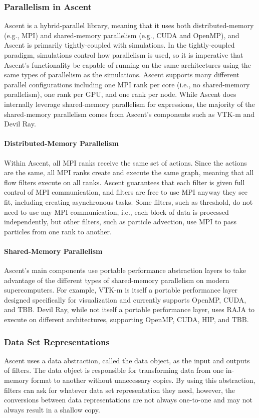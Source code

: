 \subsubsection{Parallelism in Ascent}
Ascent is a hybrid-parallel library, meaning that it uses both
distributed-memory (e.g., MPI) and shared-memory parallelism
(e.g., CUDA and OpenMP), and Ascent is primarily
tightly-coupled with simulations.
%
In the tightly-coupled paradigm, simulations control how parallelism is used, so
it is imperative that Ascent's functionality be capable of running
on the same architectures using the same types of parallelism as the
simulations.
%
Ascent supports many different parallel configurations including
one MPI rank per core (i.e., no shared-memory parallelism), one rank
per GPU, and one rank per node.
%
While Ascent does internally leverage shared-memory parallelism
for expressions, the majority of the shared-memory parallelism comes
from Ascent's components such as VTK-m and Devil Ray.

\paragraph{Distributed-Memory Parallelism}
Within Ascent, all MPI ranks receive the same set of actions.
%
Since the actions are the same, all MPI ranks create and execute the same graph,
meaning that all flow filters execute on all ranks.
%
Ascent guarantees that each filter is given full control of MPI communication,
and filters are free to use MPI anyway they see fit, including
creating asynchronous tasks.
%
Some filters, such as threshold, do not need to use any
MPI communication, i.e., each block of data is processed independently,
but other filters, such as particle advection, use MPI to pass particles
from one rank to another.
%

\paragraph{Shared-Memory Parallelism}
Ascent's main components use portable performance abstraction layers to
take advantage of the different types of shared-memory parallelism on
modern supercomputers.
%
For example, VTK-m is itself a portable performance layer designed specifically
for visualization and currently supports OpenMP, CUDA, and TBB.
%
Devil Ray, while not itself a portable performance layer, uses RAJA to execute
on different architectures, supporting OpenMP, CUDA, HIP, and TBB.

\subsubsection{Data Set Representations}
Ascent uses a data abstraction, called the data object, as the input
and outputs of filters.
%
The data object is responsible for transforming data from one in-memory format
to another without unnecessary copies.
%
By using this abstraction, filters can ask for whatever data set
representation they need, however, the conversions between data
representations are not always one-to-one and may not always
result in a shallow copy.
%

